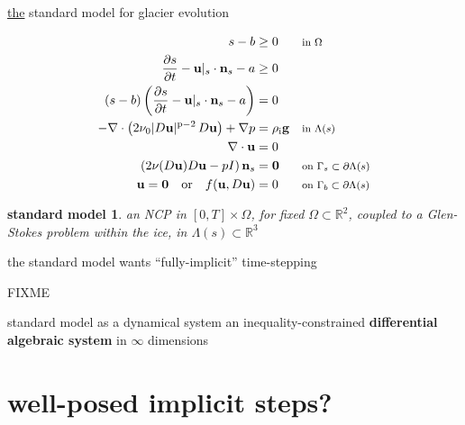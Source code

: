 \documentclass[10pt,svgnames]{beamer}
\newcommand{\bg}{\mathbf{g}}
\newcommand{\bn}{\mathbf{n}}
\newcommand{\bu}{\mathbf{u}}
\newcommand{\bzero}{\bm{0}}
\newcommand{\RR}{\mathbb{R}}
\newcommand{\pp}{\mathrm{p}}
\newcommand{\rhoi}{\rho_{\text{i}}}
\newcommand{\where}[1]{\text{\footnotesize #1}}
\begin{document}
\begin{frame}{\underline{the} standard model for glacier evolution}

\begin{align*}
s - b &\ge 0 & &\where{in $\Omega$} \\
\frac{\partial s}{\partial t} - \bu|_s \cdot \bn_s - a &\ge 0 \\
(s - b) \left(\frac{\partial s}{\partial t} - \bu|_s \cdot \bn_s - a\right) &= 0 \\
- \nabla \cdot \left(2 \nu_0 |D\bu|^{\pp-2}\, D\bu\right) + \nabla p &= \rhoi \bg && \where{in $\Lambda(s)$} \\
\nabla \cdot \bu &= 0 \\
\left(2 \nu(D\bu) D\bu - pI\right) \bn_s &= \bzero && \where{on $\Gamma_s \subset \partial\Lambda(s)$} \\
\bu  = \bzero \quad \text{or} \quad f(\bu,D\bu) &= 0 && \where{on $\Gamma_b \subset \partial\Lambda(s)$}
\end{align*}

\bigskip
\newtheorem*{smodel}{standard model}

\begin{smodel}
an NCP in $[0,T]\times \Omega$, for fixed $\Omega \subset \RR^2$, coupled to a Glen-Stokes problem within the ice, in $\Lambda(s) \subset \RR^3$
\end{smodel}
\end{frame}


\begin{frame}{the standard model wants ``fully-implicit'' time-stepping}

\begin{center}
FIXME %
\end{center}

\bigskip
\begin{block}{standard model as a dynamical system}
an inequality-constrained \textbf{differential algebraic system} in $\infty$ dimensions
\end{block}
\end{frame}




\section{well-posed implicit steps?}
\end{document}
